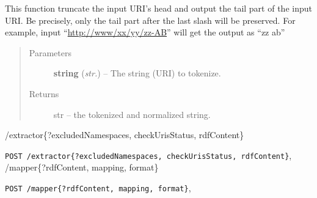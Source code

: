 \documentclass[letterpaper,10pt,english]{sphinxmanual}
\begin{document}
\begin{fulllineitems}

\begin{fulllineitems}
\label{api_ref:tokenizer.Tokenizer.tokenized_url}
This function truncate the input URI's head and 
output the tail part of the input URI. Be precisely, 
only the tail part after the last slash will be 
preserved. 
For example, 
input ``\href{http://www/xx/yy/zz-AB}{http://www/xx/yy/zz-AB}'' will get the 
output as ``zz ab''
\begin{quote}\begin{description}
\item[{Parameters}] \leavevmode
\textbf{string} (\emph{str.}) -- The string (URI) to tokenize.

\item[{Returns}] \leavevmode
str -- the tokenized and normalized string.

\end{description}\end{quote}

\end{fulllineitems}


\end{fulllineitems}



\renewcommand{\indexname}{HTTP Routing Table}
\begin{theindex}
\def\bigletter#1{{\Large\sffamily#1}\nopagebreak\vspace{1mm}}
\bigletter{/extractor\{?excludedNamespaces, checkUrisStatus, rdfContent\}}
\item {\texttt{POST /extractor\{?excludedNamespaces, checkUrisStatus, rdfContent\}}}, \pageref{api_ref:post--extractor_?excludedNamespaces, checkUrisStatus, rdfContent_}
\indexspace
\bigletter{/mapper\{?rdfContent, mapping, format\}}
\item {\texttt{POST /mapper\{?rdfContent, mapping, format\}}}, \pageref{api_ref:post--mapper_?rdfContent, mapping, format_}
\end{theindex}

\renewcommand{\indexname}{Index}
\printindex
\end{document}
